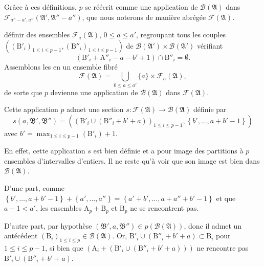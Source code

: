 \documentclass[11pt, oneside]{article}   	%
\newcommand{\interval}[2]{\left\{ #1, \dots, #2 \right\}}
\begin{document}
Grâce à ces définitions, $p$ se réécrit comme une application de $\mathcal{B}(\mathfrak{A})$
dans $\mathcal{F}_{a'' - a', a''}(\mathfrak{A}', \mathfrak{A}'' - a'')$, que nous noterons de manière abrégée $\mathcal{F}(\mathfrak{A})$.

définir des ensembles $\mathcal{F}_a (\mathfrak{A})$, $0 \leqslant a \leqslant a'$, regroupant tous les couples
$( (\mathrm{B}'_i)_{1 \leqslant i \leqslant p-1}, (\mathrm{B}''_i)_{1 \leqslant i \leqslant p-1} )$ de $\mathcal{B}(\mathfrak{A}') \times \mathcal{B}(\mathfrak{A}')$
vérifiant
\begin{equation}
 (\mathrm{B}'_i + \mathrm{A}''_i - a - b' + 1) \cap \mathrm{B}''_i = \emptyset.
\end{equation}
Assemblons les en un ensemble fibré
\begin{equation}
 \mathcal{F}(\mathfrak{A}) = \bigcup_{0 \leqslant a \leqslant a'} \{a\} \times \mathcal{F}_a (\mathfrak{A}),
\end{equation}
de sorte que $p$ devienne une application de $\mathcal{B}(\mathfrak{A})$ dans $\mathcal{F}(\mathfrak{A})$.

Cette application $p$ admet une section
$s \colon \mathcal{F}(\mathfrak{A}) \rightarrow \mathcal{B}(\mathfrak{A})$ définie par
\begin{equation}
 s(a, \mathfrak{B}', \mathfrak{B}'') = \left( (\mathrm{B}'_i \cup (\mathrm{B''}_i + b' + a) )_{1 \leqslant i \leqslant p-1}, \interval{b'}{a + b' - 1} \right)
\end{equation}
avec $b' = \max_{1 \leqslant i \leqslant p-1}(\mathrm{B}'_i) + 1$.

En effet, cette application $s$ est bien définie et a pour image des partitions à $p$ ensembles d'intervalles d'entiers.
Il ne reste qu'à voir que son image est bien dans $\mathcal{B}(\mathfrak{A})$.

D'une part, comme $\interval{b'}{a + b' - 1} + \interval{a'}{a''} = \interval{a' + b'}{a + a'' + b' - 1}$ et que $a - 1 < a'$,
les ensembles $\mathrm{A}_p + \mathrm{B}_p$ et $\mathrm{B}_p$ ne se rencontrent pas.

D'autre part, par hypothèse $(\mathfrak{B}', a, \mathfrak{B}'') \in p(\mathcal{B}(\mathfrak{A}))$,
donc il admet un antécédent $(\mathrm{B}_i)_{1 \leqslant i \leqslant p} \in \mathcal{B}(\mathfrak{A})$.
Or, $\mathrm{B}'_i \cup (\mathrm{B''}_i + b' + a) \subset \mathrm{B}_i$ pour $1 \leqslant i \leqslant p-1$,
si bien que $(\mathrm{A}_i + (\mathrm{B}'_i \cup (\mathrm{B''}_i + b' + a)))$ ne rencontre pas $\mathrm{B}'_i \cup (\mathrm{B''}_i + b' + a)$.
\end{document}
